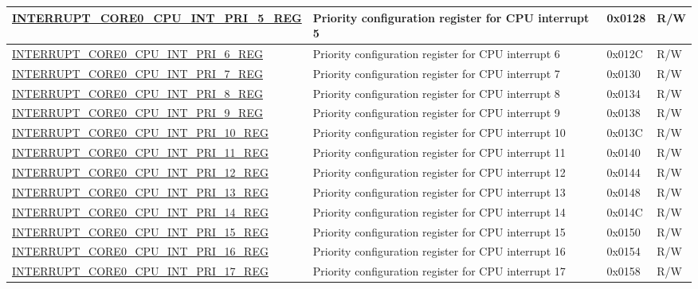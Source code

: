 \begin{longtable}{ | p{10cm} | m{9cm} | m{1.3cm} | m{1.0cm} | }
\hyperref[regdesc:INTERRUPTCORE0CPUINTPRI0REG]{INTERRUPT\_CORE0\_CPU\_INT\_PRI\_5\_REG} & Priority configuration register for CPU interrupt 5 & 0x0128 & R/W \\ \hline
\hyperref[regdesc:INTERRUPTCORE0CPUINTPRI0REG]{INTERRUPT\_CORE0\_CPU\_INT\_PRI\_6\_REG} & Priority configuration register for CPU interrupt 6 & 0x012C & R/W \\ \hline
\hyperref[regdesc:INTERRUPTCORE0CPUINTPRI0REG]{INTERRUPT\_CORE0\_CPU\_INT\_PRI\_7\_REG} & Priority configuration register for CPU interrupt 7 & 0x0130 & R/W \\ \hline
\hyperref[regdesc:INTERRUPTCORE0CPUINTPRI0REG]{INTERRUPT\_CORE0\_CPU\_INT\_PRI\_8\_REG} & Priority configuration register for CPU interrupt 8 & 0x0134 & R/W \\ \hline
\hyperref[regdesc:INTERRUPTCORE0CPUINTPRI0REG]{INTERRUPT\_CORE0\_CPU\_INT\_PRI\_9\_REG} & Priority configuration register for CPU interrupt 9 & 0x0138 & R/W \\ \hline
\hyperref[regdesc:INTERRUPTCORE0CPUINTPRI0REG]{INTERRUPT\_CORE0\_CPU\_INT\_PRI\_10\_REG} & Priority configuration register for CPU interrupt 10 & 0x013C & R/W \\ \hline
\hyperref[regdesc:INTERRUPTCORE0CPUINTPRI0REG]{INTERRUPT\_CORE0\_CPU\_INT\_PRI\_11\_REG} & Priority configuration register for CPU interrupt 11 & 0x0140 & R/W \\ \hline
\hyperref[regdesc:INTERRUPTCORE0CPUINTPRI0REG]{INTERRUPT\_CORE0\_CPU\_INT\_PRI\_12\_REG} & Priority configuration register for CPU interrupt 12 & 0x0144 & R/W \\ \hline
\hyperref[regdesc:INTERRUPTCORE0CPUINTPRI0REG]{INTERRUPT\_CORE0\_CPU\_INT\_PRI\_13\_REG} & Priority configuration register for CPU interrupt 13 & 0x0148 & R/W \\ \hline
\hyperref[regdesc:INTERRUPTCORE0CPUINTPRI0REG]{INTERRUPT\_CORE0\_CPU\_INT\_PRI\_14\_REG} & Priority configuration register for CPU interrupt 14 & 0x014C & R/W \\ \hline
\hyperref[regdesc:INTERRUPTCORE0CPUINTPRI0REG]{INTERRUPT\_CORE0\_CPU\_INT\_PRI\_15\_REG} & Priority configuration register for CPU interrupt 15 & 0x0150 & R/W \\ \hline
\hyperref[regdesc:INTERRUPTCORE0CPUINTPRI0REG]{INTERRUPT\_CORE0\_CPU\_INT\_PRI\_16\_REG} & Priority configuration register for CPU interrupt 16 & 0x0154 & R/W \\ \hline
\hyperref[regdesc:INTERRUPTCORE0CPUINTPRI0REG]{INTERRUPT\_CORE0\_CPU\_INT\_PRI\_17\_REG} & Priority configuration register for CPU interrupt 17 & 0x0158 & R/W \\ \hline

\end{longtable}
